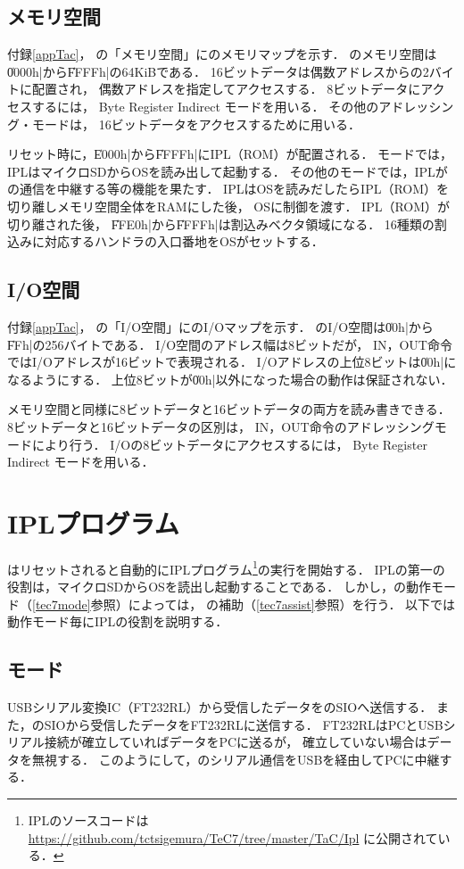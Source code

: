 \subsection{メモリ空間}
付録\ref{appTac}，
の「メモリ空間」に{\tac}のメモリマップを示す．
{\tac}のメモリ空間は\|0000h|から\|FFFFh|の64KiBである．
16ビットデータは偶数アドレスからの2バイトに配置され，
偶数アドレスを指定してアクセスする．
8ビットデータにアクセスするには，
Byte Register Indirect モードを用いる．
その他のアドレッシング・モードは，
16ビットデータをアクセスするために用いる．

リセット時に，\|E000h|から\|FFFFh|にIPL（ROM）が配置される．
{\tac}モードでは，IPLはマイクロSDからOSを読み出して起動する．
その他のモードでは，IPLが{\tec}の通信を中継する等の機能を果たす．
IPLはOSを読みだしたらIPL（ROM）を切り離しメモリ空間全体をRAMにした後，
OSに制御を渡す．
IPL（ROM）が切り離された後，
\|FFE0h|から\|FFFFh|は割込みベクタ領域になる．
16種類の割込みに対応するハンドラの入口番地をOSがセットする．

\subsection{I/O空間}
付録\ref{appTac}，
の「I/O空間」に{\tac}のI/Oマップを示す．
{\tac}のI/O空間は\|00h|から\|FFh|の256バイトである．
I/O空間のアドレス幅は8ビットだが，
IN，OUT命令ではI/Oアドレスが16ビットで表現される．
I/Oアドレスの上位8ビットは\|00h|になるようにする．
上位8ビットが\|00h|以外になった場合の動作は保証されない．

メモリ空間と同様に8ビットデータと16ビットデータの両方を読み書きできる．
8ビットデータと16ビットデータの区別は，
IN，OUT命令のアドレッシングモードにより行う．
I/Oの8ビットデータにアクセスするには，
Byte Register Indirect モードを用いる．

\section{IPLプログラム}
\label{ipl}
{\tac}はリセットされると自動的にIPLプログラム\footnote{
IPLのソースコードは
\url{https://github.com/tctsigemura/TeC7/tree/master/TaC/Ipl}
に公開されている．
}の実行を開始する．
IPLの第一の役割は，マイクロSDからOSを読出し起動することである．
しかし，{\tecS}の動作モード（\ref{tec7mode}参照）によっては，
{\tec}の補助（\ref{tec7assist}参照）を行う．
以下では動作モード毎にIPLの役割を説明する．

\subsection{{\tec}モード}
USBシリアル変換IC（FT232RL）から受信したデータを{\tec}のSIOへ送信する．
また，{\tec}のSIOから受信したデータをFT232RLに送信する．
FT232RLはPCとUSBシリアル接続が確立していればデータをPCに送るが，
確立していない場合はデータを無視する．
このようにして，{\tec}のシリアル通信をUSBを経由してPCに中継する．

